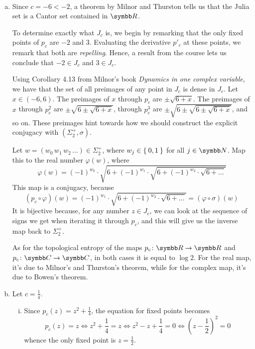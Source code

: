 \begin{problem}
~
\begin{enumerate}[a)]
    \item Since \(c = -6 < -2\), a theorem by Milnor and Thurston tells us that the Julia set is a Cantor set contained in \(\reals\).

    To determine exactly what \(J_c\) is, we begin by remarking that the only fixed points of \(p_c\) are \(-2\) and \(3\). Evaluating the derivative \(p'_c\) at these points, we remark that both are \emph{repelling}. Hence, a result from the course lets us conclude that \(-2 \in J_c\) and \(3 \in J_c\).
    
    Using Corollary 4.13 from Milnor's book \textit{Dynamics in one complex variable}, we have that the set of all preimages of any point in \(J_c\) is dense in \(J_c\). Let \(x \in (-6, 6)\). The preimages of \(x\) through \(p_c\) are \(\pm \sqrt{6 + x}\). The preimages of \(x\) through \(p_c^2\) are \(\pm \sqrt{6 \pm \sqrt{6 + x}}\), through \(p_c^3\) are \(\pm \sqrt{6 \pm \sqrt{6 \pm \sqrt{6 + x}}}\), and so on. These preimages hint towards how we should construct the explicit conjugacy with \(\left(\Sigma_2^+, \sigma\right)\).

    Let \(w = (w_0 \, w_1 \, w_2 \, \dots) \in \Sigma^{+}_{2}\), where \(w_j \in \Set{ 0, 1 }\) for all \(j \in \naturals\). Map this to the real number \(\varphi(w)\), where
    \[
        \varphi(w) = (-1)^{w_0} \cdot \sqrt{6 + (-1)^{w_1} \cdot \sqrt{6 + (-1)^{w_2} \cdot \sqrt{6 + \dots}}}
    \]
    This map is a conjugacy, because
    \[
        \left(p_c \circ \varphi\right)(w) = (-1)^{w_1} \cdot \sqrt{6 + (-1)^{w_2} \cdot \sqrt{6 + \dots}} = \left(\varphi \circ \sigma\right) (w)
    \]
    It is bijective because, for any number \(z \in J_c\), we can look at the sequence of signs we get when iterating it through \(p_c\), and this will give us the inverse map back to \(\Sigma^{+}_{2}\).

    As for the topological entropy of the maps \(p_c \colon \reals \to \reals\) and \(p_c \colon \complex \to \complex\), in both cases it is equal to \(\log 2\). For the real map, it's due to Milnor's and Thurston's theorem, while for the complex map, it's due to Bowen's theorem.

    \item Let \(c = \frac{1}{4}\).
    \begin{enumerate}[i)]
        \item Since \(p_c (z) = z^2 + \frac{1}{4}\), the equation for fixed points becomes
        \[
            p_c(z) = z \iff z^2 + \frac{1}{4} = z \iff z^2 - z + \frac{1}{4} = 0 \iff \left(z - \frac{1}{2}\right)^2 = 0
        \]
        whence the only fixed point is \(z = \frac{1}{2}\).


\end{enumerate}
\end{enumerate}
\end{problem}
